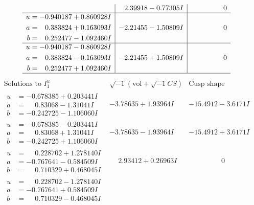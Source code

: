 \documentclass[1p]{elsarticle_modified}
\theoremstyle{definition}
\newcommand{\I}{\sqrt{-1}}
\begin{document}
$$\begin{array}{c|c|c}
 & \phantom{-}2.39918 - 0.77305 I & \phantom{-0.000000 } 0 \\ \hline\begin{aligned}
u &= -0.940187 + 0.860928 I \\
a &= \phantom{-}0.383824 + 0.163093 I \\
b &= \phantom{-}0.252477 - 1.092460 I\end{aligned}
 & -2.21455 - 1.50809 I & \phantom{-0.000000 } 0 \\ \hline\begin{aligned}
u &= -0.940187 - 0.860928 I \\
a &= \phantom{-}0.383824 - 0.163093 I \\
b &= \phantom{-}0.252477 + 1.092460 I\end{aligned}
 & -2.21455 + 1.50809 I & \phantom{-0.000000 } 0\\
 \hline 
 \end{array}$$\newpage$$\begin{array}{c|c|c}  
\text{Solutions to }I^u_{1}& \I (\text{vol} + \sqrt{-1}CS) & \text{Cusp shape}\\
 \hline 
\begin{aligned}
u &= -0.678385 + 0.203441 I \\
a &= \phantom{-}0.83068 - 1.31041 I \\
b &= -0.242725 - 1.106060 I\end{aligned}
 & -3.78635 + 1.93964 I & -15.4912 - 3.6171 I \\ \hline\begin{aligned}
u &= -0.678385 - 0.203441 I \\
a &= \phantom{-}0.83068 + 1.31041 I \\
b &= -0.242725 + 1.106060 I\end{aligned}
 & -3.78635 - 1.93964 I & -15.4912 + 3.6171 I \\ \hline\begin{aligned}
u &= \phantom{-}0.228702 + 1.278140 I \\
a &= -0.767641 - 0.584509 I \\
b &= \phantom{-}0.710329 + 0.468045 I\end{aligned}
 & \phantom{-}2.93412 + 0.26963 I & \phantom{-0.000000 } 0 \\ \hline\begin{aligned}
u &= \phantom{-}0.228702 - 1.278140 I \\
a &= -0.767641 + 0.584509 I \\
b &= \phantom{-}0.710329 - 0.468045 I\end{aligned}

\end{array}$$
\end{document}
